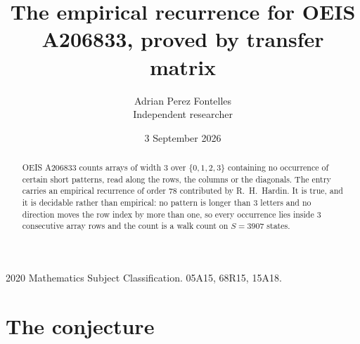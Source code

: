 \documentclass[11pt,a4paper]{article}
\title{The empirical recurrence for OEIS A206833, proved by transfer matrix}
\author{Adrian Perez Fontelles\\ \small Independent researcher}
\date{3 September 2026}
\theoremstyle{plain}
\theoremstyle{definition}
\begin{document}
\maketitle

\begin{abstract}
OEIS A206833 counts arrays of width $3$ over $\{0,1,2,3\}$ containing no occurrence of certain short
patterns, read along the rows, the columns or the diagonals. The entry carries an empirical
recurrence of order $78$ contributed by R.~H.~Hardin. It is true, and it is decidable
rather than empirical: no pattern is longer than $3$ letters and no direction moves the row
index by more than one, so every occurrence lies inside $3$ consecutive array rows and the
count is a walk count on $S=3907$ states.
\end{abstract}

\noindent\small 2020 Mathematics Subject Classification. 05A15, 68R15, 15A18.\normalsize

\section{The conjecture}
\end{document}
